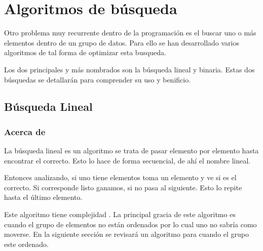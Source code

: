 \documentclass[letterpaper,10pt,spanish]{sphinxmanual}
\begin{document}


\chapter{Algoritmos de búsqueda}
\label{\detokenize{busqueda/busqueda:algoritmos-de-busqueda}}\label{\detokenize{busqueda/busqueda::doc}}
Otro problema muy recurrente dentro de la programación es el buscar uno o más elementos dentro de un grupo de datos. Para ello se han desarrollado varios algoritmos de tal forma de optimizar esta busqueda.

Los dos principales y más nombrados son la búsqueda lineal y binaria. Estas dos búsquedas se detallarán para comprender su uso y benificio.


\section{Búsqueda Lineal}
\label{\detokenize{busqueda/lineal:busqueda-lineal}}\label{\detokenize{busqueda/lineal::doc}}

\subsection{Acerca de}
\label{\detokenize{busqueda/lineal:acerca-de}}
La búsqueda lineal es un algoritmo se trata de pasar elemento por elemento hasta encontrar el correcto. Esto lo hace de forma secuencial, de ahí el nombre lineal.

Entonces analizando, si uno tiene  elementos toma un elemento y ve si es el correcto. Si corresponde listo ganamos, si no pasa al siguiente. Esto lo repite hasta el último elemento.

Este algoritmo tiene complejidad . La principal gracia de este algoritmo es cuando el grupo de elementos no están ordenados por lo cual uno no sabría como moverse. En la siguiente sección se revisará un algoritmo para cuando el grupo este ordenado.
\end{document}
